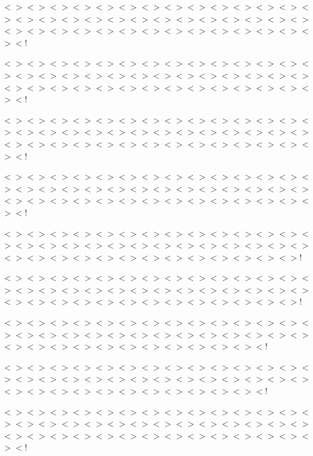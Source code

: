 $<$$>$$<$$>$$<$$>$$<$$>$$<$$>$$<$$>$$<$$>$$<$$>$$<$$>$$<$$>$$<$$>$$<$$>$$<$$>$$<$$>$$<$$>$$<$$>$$<$$>$$<$$>$$<$$>$$<$$>$$<$$>$$<$$>$$<$$>$$<$$>$$<$$>$$<$$>$$<$$>$$<$$>$$<$$>$$<$$>$$<$$>$$<$$>$$<$$>$$<$$>$$<$$>$$<$$>$$<$$>$$<$$>$$<$$>$$<$$>$$<$$>$$<$!

$<$$>$$<$$>$$<$$>$$<$$>$$<$$>$$<$$>$$<$$>$$<$$>$$<$$>$$<$$>$$<$$>$$<$$>$$<$$>$$<$$>$$<$$>$$<$$>$$<$$>$$<$$>$$<$$>$$<$$>$$<$$>$$<$$>$$<$$>$$<$$>$$<$$>$$<$$>$$<$$>$$<$$>$$<$$>$$<$$>$$<$$>$$<$$>$$<$$>$$<$$>$$<$$>$$<$$>$$<$$>$$<$$>$$<$$>$$<$$>$$<$$>$$<$!

$<$$>$$<$$>$$<$$>$$<$$>$$<$$>$$<$$>$$<$$>$$<$$>$$<$$>$$<$$>$$<$$>$$<$$>$$<$$>$$<$$>$$<$$>$$<$$>$$<$$>$$<$$>$$<$$>$$<$$>$$<$$>$$<$$>$$<$$>$$<$$>$$<$$>$$<$$>$$<$$>$$<$$>$$<$$>$$<$$>$$<$$>$$<$$>$$<$$>$$<$$>$$<$$>$$<$$>$$<$$>$$<$$>$$<$$>$$<$$>$$<$$>$$<$!

$<$$>$$<$$>$$<$$>$$<$$>$$<$$>$$<$$>$$<$$>$$<$$>$$<$$>$$<$$>$$<$$>$$<$$>$$<$$>$$<$$>$$<$$>$$<$$>$$<$$>$$<$$>$$<$$>$$<$$>$$<$$>$$<$$>$$<$$>$$<$$>$$<$$>$$<$$>$$<$$>$$<$$>$$<$$>$$<$$>$$<$$>$$<$$>$$<$$>$$<$$>$$<$$>$$<$$>$$<$$>$$<$$>$$<$$>$$<$$>$$<$$>$$<$!

$<$$>$$<$$>$$<$$>$$<$$>$$<$$>$$<$$>$$<$$>$$<$$>$$<$$>$$<$$>$$<$$>$$<$$>$$<$$>$$<$$>$$<$$>$$<$$>$$<$$>$$<$$>$$<$$>$$<$$>$$<$$>$$<$$>$$<$$>$$<$$>$$<$$>$$<$$>$$<$$>$$<$$>$$<$$>$$<$$>$$<$$>$$<$$>$$<$$>$$<$$>$$<$$>$$<$$>$$<$$>$$<$$>$$<$$>$$<$$>$!

$<$$>$$<$$>$$<$$>$$<$$>$$<$$>$$<$$>$$<$$>$$<$$>$$<$$>$$<$$>$$<$$>$$<$$>$$<$$>$$<$$>$$<$$>$$<$$>$$<$$>$$<$$>$$<$$>$$<$$>$$<$$>$$<$$>$$<$$>$$<$$>$$<$$>$$<$$>$$<$$>$$<$$>$$<$$>$$<$$>$$<$$>$$<$$>$$<$$>$$<$$>$$<$$>$$<$$>$$<$$>$$<$$>$$<$$>$$<$$>$!

$<$$>$$<$$>$$<$$>$$<$$>$$<$$>$$<$$>$$<$$>$$<$$>$$<$$>$$<$$>$$<$$>$$<$$>$$<$$>$$<$$>$$<$$>$$<$$>$$<$$>$$<$$>$$<$$>$$<$$>$$<$$>$$<$$>$$<$$>$$<$$>$$<$$>$$<$$>$$<$$>$$<$$>$$<$$>$$<$$>$$<$$>$$<$$>$$<$$>$$<$$>$$<$$>$$<$$>$$<$$>$$<$$>$$<$!

$<$$>$$<$$>$$<$$>$$<$$>$$<$$>$$<$$>$$<$$>$$<$$>$$<$$>$$<$$>$$<$$>$$<$$>$$<$$>$$<$$>$$<$$>$$<$$>$$<$$>$$<$$>$$<$$>$$<$$>$$<$$>$$<$$>$$<$$>$$<$$>$$<$$>$$<$$>$$<$$>$$<$$>$$<$$>$$<$$>$$<$$>$$<$$>$$<$$>$$<$$>$$<$$>$$<$$>$$<$$>$$<$$>$$<$!

$<$$>$$<$$>$$<$$>$$<$$>$$<$$>$$<$$>$$<$$>$$<$$>$$<$$>$$<$$>$$<$$>$$<$$>$$<$$>$$<$$>$$<$$>$$<$$>$$<$$>$$<$$>$$<$$>$$<$$>$$<$$>$$<$$>$$<$$>$$<$$>$$<$$>$$<$$>$$<$$>$$<$$>$$<$$>$$<$$>$$<$$>$$<$$>$$<$$>$$<$$>$$<$$>$$<$$>$$<$$>$$<$$>$$<$$>$$<$$>$$<$$>$$<$!

